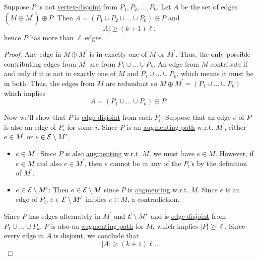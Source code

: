 \begin{lemma}\label{lma:lec25-4}
	Suppose \(P\) is not \hyperref[def:vertex-independent]{vertex-disjoint} from \(P_1, P_2, \ldots , P_k \). Let \(A\) be the set of edges \((M\oplus M^\prime )\oplus P\).
	Then \(A = (P_1\cup P_2 \cup \ldots \cup P_k )\oplus P\) and
	\[
		\left\vert A \right\vert \geq (k+1)\ell,
	\]
	hence \(P\) has more than \(\ell \) edges.
\end{lemma}
\begin{proof}
	Any edge in \(M\oplus M^\prime \) is in exactly one of \(M\) or \(M^\prime \). Thus, the only possible contributing edges from \(M^\prime \) are from \(P_1 \cup \ldots  \cup P_k\).
	An edge from \(M\) contribute if and only if it is not in exactly one of \(M\) and \(P_1 \cup \ldots  \cup P_k\), which means it must be in both. Thus, the edges from
	\(M\) are redundant so \(M\oplus M^\prime = (P_1 \cup \ldots \cup P_k )\) which implies
	\[
		A = (P_1 \cup \ldots  \cup P_k)\oplus P.
	\]

	Now we'll show that \(P\) is \hyperref[def:edge-independent]{edge disjoint} from each \(P_i\). Suppose that an edge \(e\) of \(P\) is also an edge of \(P_i\) for some \(i\).
	Since \(P\) is an \hyperref[def:augmenting-path]{augmenting path} w.r.t. \(M^\prime \), either \(e\in M^\prime \) or \(e\in \mathcal{\MakeUppercase{E}} \setminus M^\prime \).
	\begin{itemize}
		\item \(e\in M^\prime \): Since \(P\) is also \hyperref[def:augmenting-path]{augmenting} w.r.t. \(M\), we must have \(e\in M\). However, if \(e\in M\) and also \(e\in M^\prime \),
		      then \(e\) cannot be in any of the \(P_i\)'s by the definition of \(M^\prime \).
		\item \(e\in \mathcal{\MakeUppercase{e}} \setminus M^\prime \): Then \(e\in \mathcal{\MakeUppercase{e}} \setminus M\) since \(P\) is \hyperref[def:augmenting-path]{augmenting} w.r.t. \(M\).
		      Since \(e\) is an edge of \(P_i\), \(e\in \mathcal{\MakeUppercase{e}} \setminus M^\prime \) implies \(e\in M\), a contradiction.
	\end{itemize}

	Since \(P\) has edges alternately in \(M^\prime \) and \(\mathcal{\MakeUppercase{e}} \setminus M^\prime \) and is \hyperref[def:edge-independent]{edge disjoint} from
	\(P_1 \cup \ldots  \cup P_k\), \(P\) is also an \hyperref[def:augmenting-path]{augmenting path} for \(M\), which implies \(\left\vert P \right\vert \geq \ell \). Since
	every edge in \(A\) is disjoint, we conclude that
	\[
		\left\vert A \right\vert \geq (k + 1) \ell .
	\]
\end{proof}

